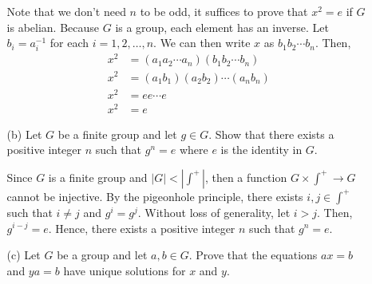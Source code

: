 \begin{enumerate}
\begin{enumerate}
        Note that we don't need \(n\) to be odd, it suffices to prove that \(x^2 = e\) if \(G\) is abelian. Because \(G\) is a group, each element has an inverse. Let \(b_i = a_i^{-1}\) for each \(i = 1, 2, \ldots, n\). We can then write \(x\) as \(b_1 b_2 \cdots b_n\). Then,
        \begin{align*}
            x^2 &= (a_1a_2\cdots a_n)(b_1b_2\cdots b_n) \\
            x^2 &= (a_1 b_1)(a_2 b_2) \cdots (a_n b_n) \\
            x^2 &= ee \cdots e \\
            x^2 &= e
        \end{align*}

        \item[(b)] Let \(G\) be a finite group and let \(g\in G\). Show that there exists a positive integer \(n\) such that \(g^n = e\) where \(e\) is the identity in \(G\).

        Since \(G\) is a finite group and \(|G| < |\int^+|\), then a function \(G \times \int^+ \to G\) cannot be injective. By the pigeonhole principle, there exists \(i, j\in \int^+\) such that \(i \neq j\) and \(g^{i} = g^{j}\). Without loss of generality, let \(i > j\). Then, \(g^{i - j} = e\). Hence, there exists a positive integer \(n\) such that \(g^n = e\).

        \item[(c)] Let \(G\) be a group and let \(a, b\in G\). Prove that the equations \(ax = b\) and \(ya = b\) have unique solutions for \(x\) and \(y\).


\end{enumerate}
\end{enumerate}
